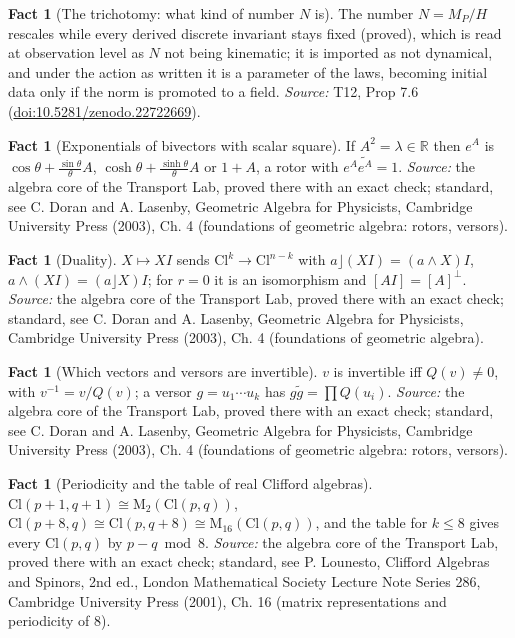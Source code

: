 \documentclass[11pt]{article}
\theoremstyle{definition}
\newtheorem{fact}[theorem]{Fact}
\theoremstyle{plain}
\providecommand{\Cl}{}\renewcommand{\Cl}{\mathrm{Cl}}
\providecommand{\Mat}{}\renewcommand{\Mat}{\mathrm{M}}
\providecommand{\R}{}\renewcommand{\R}{\mathbb{R}}
\begin{document}
\begin{fact}[The trichotomy: what kind of number $N$ is]\label{c:standard-model.trichotomy-what-kind-number}
The number $N = M_{P}/H$ rescales while every derived discrete invariant stays fixed (proved), which is read at observation level as $N$ not being kinematic; it is imported as not dynamical, and under the action as written it is a parameter of the laws, becoming initial data only if the norm is promoted to a field.
\emph{Source:} T12, Prop 7.6 (\href{https://doi.org/10.5281/zenodo.22722669}{doi:10.5281/zenodo.22722669}).
\end{fact}

\begin{fact}[Exponentials of bivectors with scalar square]\label{c:std-algebra.bivector-exponential}
If $A^{2} = \lambda \in \R$ then $e^{A}$ is $\cos\theta + \frac{\sin\theta}{\theta}A$, $\cosh\theta + \frac{\sinh\theta}{\theta}A$ or $1 + A$, a rotor with $e^{A}\widetilde{e^{A}} = 1$.
\emph{Source:} the algebra core of the Transport Lab, proved there with an exact check; standard, see C. Doran and A. Lasenby, Geometric Algebra for Physicists, Cambridge University Press (2003), Ch. 4 (foundations of geometric algebra: rotors, versors).
\end{fact}

\begin{fact}[Duality]\label{c:std-algebra.duality}
$X \mapsto XI$ sends $\Cl^{k} \to \Cl^{n-k}$ with $a \rfloor (XI) = (a \wedge X)I$, $a \wedge (XI) = (a \rfloor X)I$; for $r = 0$ it is an isomorphism and $[AI] = [A]^{\perp}$.
\emph{Source:} the algebra core of the Transport Lab, proved there with an exact check; standard, see C. Doran and A. Lasenby, Geometric Algebra for Physicists, Cambridge University Press (2003), Ch. 4 (foundations of geometric algebra).
\end{fact}

\begin{fact}[Which vectors and versors are invertible]\label{c:std-algebra.inverse-of-vector}
$v$ is invertible iff $Q(v) \ne 0$, with $v^{-1} = v/Q(v)$; a versor $g = u_1 \cdots u_k$ has $g\tilde{g} = \prod Q(u_i)$.
\emph{Source:} the algebra core of the Transport Lab, proved there with an exact check; standard, see C. Doran and A. Lasenby, Geometric Algebra for Physicists, Cambridge University Press (2003), Ch. 4 (foundations of geometric algebra: rotors, versors).
\end{fact}

\begin{fact}[Periodicity and the table of real Clifford algebras]\label{c:std-algebra.periodicity}
$\Cl(p{+}1,q{+}1) \cong \Mat_2(\Cl(p,q))$, $\Cl(p{+}8,q) \cong \Cl(p,q{+}8) \cong \Mat_{16}(\Cl(p,q))$, and the table for $k \le 8$ gives every $\Cl(p,q)$ by $p - q \bmod 8$.
\emph{Source:} the algebra core of the Transport Lab, proved there with an exact check; standard, see P. Lounesto, Clifford Algebras and Spinors, 2nd ed., London Mathematical Society Lecture Note Series 286, Cambridge University Press (2001), Ch. 16 (matrix representations and periodicity of 8).
\end{fact}
\end{document}
